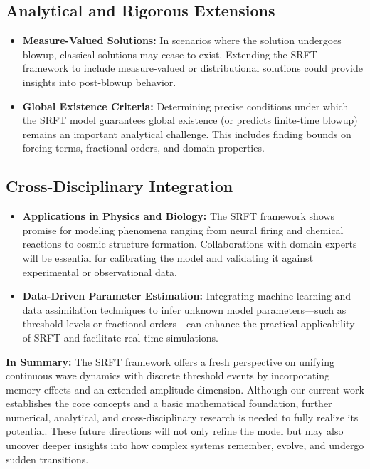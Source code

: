 \documentclass[12pt]{article}
\begin{document}
\medskip
\subsection{Analytical and Rigorous Extensions}
\begin{itemize}
    \item \textbf{Measure-Valued Solutions:}  
          In scenarios where the solution undergoes blowup, classical solutions may cease to exist. Extending the SRFT framework to include measure-valued or distributional solutions could provide insights into post-blowup behavior.
    \item \textbf{Global Existence Criteria:}  
          Determining precise conditions under which the SRFT model guarantees global existence (or predicts finite-time blowup) remains an important analytical challenge. This includes finding bounds on forcing terms, fractional orders, and domain properties.
\end{itemize}

\medskip
\subsection{Cross-Disciplinary Integration}
\begin{itemize}
    \item \textbf{Applications in Physics and Biology:}  
          The SRFT framework shows promise for modeling phenomena ranging from neural firing and chemical reactions to cosmic structure formation. Collaborations with domain experts will be essential for calibrating the model and validating it against experimental or observational data.
    \item \textbf{Data-Driven Parameter Estimation:}  
          Integrating machine learning and data assimilation techniques to infer unknown model parameters—such as threshold levels or fractional orders—can enhance the practical applicability of SRFT and facilitate real-time simulations.
\end{itemize}

\medskip
\noindent
\textbf{In Summary:}  
The SRFT framework offers a fresh perspective on unifying continuous wave dynamics with discrete threshold events by incorporating memory effects and an extended amplitude dimension. Although our current work establishes the core concepts and a basic mathematical foundation, further numerical, analytical, and cross-disciplinary research is needed to fully realize its potential. These future directions will not only refine the model but may also uncover deeper insights into how complex systems remember, evolve, and undergo sudden transitions.
\end{document}
